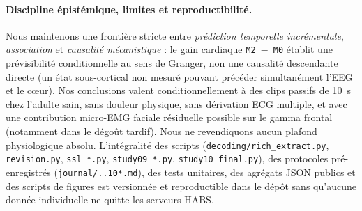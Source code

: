 \documentclass[10pt]{article}
\begin{document}
\paragraph{Discipline épistémique, limites et reproductibilité.}
Nous maintenons une frontière stricte entre \emph{prédiction temporelle incrémentale}, \emph{association} et \emph{causalité mécanistique} : le gain cardiaque \texttt{M2 $-$ M0} établit une prévisibilité conditionnelle au sens de Granger, non une causalité descendante directe (un état sous-cortical non mesuré pouvant précéder simultanément l'EEG et le cœur). Nos conclusions valent conditionnellement à des clips passifs de 10~s chez l'adulte sain, sans douleur physique, sans dérivation ECG multiple, et avec une contribution micro-EMG faciale résiduelle possible sur le gamma frontal (notamment dans le dégoût tardif). Nous ne revendiquons aucun plafond physiologique absolu. L'intégralité des scripts (\texttt{decoding/\allowbreak rich\_extract.py}, \texttt{revision.py}, \texttt{ssl\_*.py}, \texttt{study09\_*.py}, \texttt{study10\_final.py}), des protocoles pré-enregistrés (\texttt{journal/..10*.md}), des tests unitaires, des agrégats JSON publics et des scripts de figures est versionnée et reproductible dans le dépôt sans qu'aucune donnée individuelle ne quitte les serveurs HABS.
\end{document}
